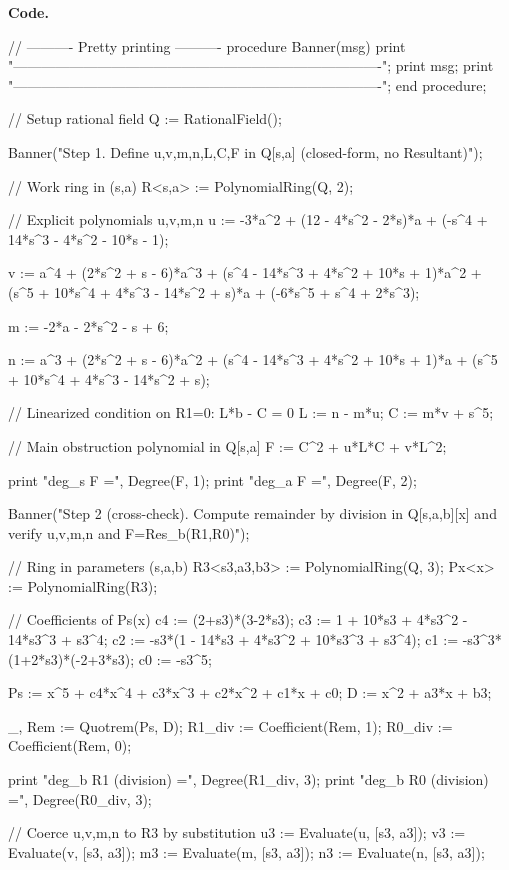 \documentclass[12pt]{article}
\theoremstyle{remark}
\theoremstyle{definition}
\begin{document}
\noindent\textbf{Code.}
\begin{code}
// ---------- Pretty printing ----------
procedure Banner(msg)
    print "\n-------------------------------------------------------------------------------";
    print msg;
    print "-------------------------------------------------------------------------------\n";
end procedure;

// Setup rational field
Q := RationalField();

Banner("Step 1. Define u,v,m,n,L,C,F in Q[s,a] (closed-form, no Resultant)");

// Work ring in (s,a)
R<s,a> := PolynomialRing(Q, 2);

// Explicit polynomials u,v,m,n
u := -3*a^2 + (12 - 4*s^2 - 2*s)*a + (-s^4 + 14*s^3 - 4*s^2 - 10*s - 1);

v := a^4 + (2*s^2 + s - 6)*a^3
     + (s^4 - 14*s^3 + 4*s^2 + 10*s + 1)*a^2
     + (s^5 + 10*s^4 + 4*s^3 - 14*s^2 + s)*a
     + (-6*s^5 + s^4 + 2*s^3);

m := -2*a - 2*s^2 - s + 6;

n := a^3 + (2*s^2 + s - 6)*a^2
     + (s^4 - 14*s^3 + 4*s^2 + 10*s + 1)*a
     + (s^5 + 10*s^4 + 4*s^3 - 14*s^2 + s);

// Linearized condition on R1=0:  L*b - C = 0
L := n - m*u;
C := m*v + s^5;

// Main obstruction polynomial in Q[s,a]
F := C^2 + u*L*C + v*L^2;

print "deg_s F =", Degree(F, 1);
print "deg_a F =", Degree(F, 2);

Banner("Step 2 (cross-check). Compute remainder by division in Q[s,a,b][x] and verify u,v,m,n and F=Res_b(R1,R0)");

// Ring in parameters (s,a,b)
R3<s3,a3,b3> := PolynomialRing(Q, 3);
Px<x> := PolynomialRing(R3);

// Coefficients of Ps(x)
c4 := (2+s3)*(3-2*s3);
c3 := 1 + 10*s3 + 4*s3^2 - 14*s3^3 + s3^4;
c2 := -s3*(1 - 14*s3 + 4*s3^2 + 10*s3^3 + s3^4);
c1 := -s3^3*(1+2*s3)*(-2+3*s3);
c0 := -s3^5;

Ps := x^5 + c4*x^4 + c3*x^3 + c2*x^2 + c1*x + c0;
D  := x^2 + a3*x + b3;

_, Rem := Quotrem(Ps, D);
R1_div := Coefficient(Rem, 1);
R0_div := Coefficient(Rem, 0);

print "deg_b R1 (division) =", Degree(R1_div, 3);
print "deg_b R0 (division) =", Degree(R0_div, 3);

// Coerce u,v,m,n to R3 by substitution
u3 := Evaluate(u, [s3, a3]);
v3 := Evaluate(v, [s3, a3]);
m3 := Evaluate(m, [s3, a3]);
n3 := Evaluate(n, [s3, a3]);


\end{code}
\end{document}
